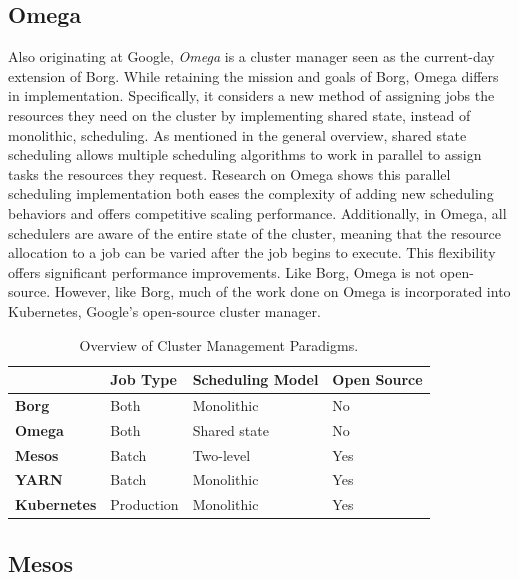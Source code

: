 \documentclass[twoside]{report}
\begin{document}
\subsection{Omega}

Also originating at Google, \textit{Omega} is a cluster manager seen as the
current-day extension of Borg. While retaining the mission and goals of Borg,
Omega differs in implementation. Specifically, it considers a new method of
assigning jobs the resources they need on the cluster by implementing
shared state, instead of monolithic, scheduling. As mentioned in the general
overview, shared state scheduling allows multiple scheduling algorithms to work
in parallel to assign tasks the resources they request. Research on Omega shows
this parallel scheduling implementation both eases the complexity of adding new
scheduling behaviors and offers competitive scaling performance.\cite[pg.
358-359]{omega} Additionally, in Omega, all schedulers are aware of the entire
state of the cluster, meaning that the resource allocation to a job can be
varied after the job begins to execute. This flexibility offers significant
performance improvements.\cite[pg.352]{omega} Like Borg, Omega is not
open-source. However, like Borg, much of the work done on Omega is incorporated
into Kubernetes, Google's open-source cluster manager.


\begin{table}[]
\centering
\caption{Overview of Cluster Management Paradigms.}
\begin{tabular}{|l|l|l|l|}
\hline
                    & \textbf{Job Type} & \textbf{Scheduling Model} &
                    \textbf{Open Source} \\ \hline
\textbf{Borg}       & Both              & Monolithic                & No
\\ \hline
\textbf{Omega}      & Both              & Shared state              & No
\\ \hline
\textbf{Mesos}      & Batch             & Two-level                 & Yes
\\ \hline
\textbf{YARN}       & Batch             & Monolithic                & Yes
\\ \hline
\textbf{Kubernetes} & Production        & Monolithic                & Yes
\\ \hline
\end{tabular}
\end{table}

\subsection{Mesos}
\end{document}
